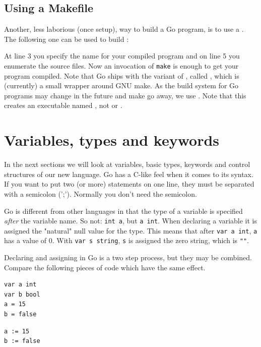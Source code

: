 \subsection{Using a Makefile}
\label{sec:building a program}
Another, less laborious (once setup), way to build a Go program, is to use a
. The following one can be used to build
:

At line 3 you specify the name for your compiled program and on line 5
you enumerate the source files. Now an invocation of \verb|make| is
enough to get your program compiled. Note that Go ships with the variant
of , called , which is (currently) a small
wrapper around GNU make. As the build system for Go programs may
change in the future and make  go away, we use .
Note that this  creates an executable named
, not  or .

\section{Variables, types and keywords}
\label{sec:vars}
In the next sections we will look at variables, basic types,
keywords and control structures of our new language. 
Go has a C-like feel when it comes to its syntax. 
If you want to put two (or more) statements on one line, they must be
separated with a semicolon (';'). Normally you don't need the semicolon.

Go is different from other languages in that the type of a variable
is specified \emph{after} the variable name. So not: 
\lstinline{int a}, but \lstinline{a int}. When declaring a variable it
is assigned the "natural" null value for the type. This means that after
\lstinline{var a int}, \lstinline{a} has a value of 0. With
\lstinline{var s string}, \lstinline{s} is assigned the zero string,
which is \lstinline{""}. 

Declaring and assigning in Go is a two step process, but they may
be combined. Compare the following pieces of code which have
the same effect. 

\begin{minipage}{.5\textwidth}
\begin{lstlisting}[linewidth=.5\textwidth,caption={Declaration with =}]
var a int
var b bool
a = 15
b = false
\end{lstlisting}
\hfill
\end{minipage}
\begin{minipage}{.5\textwidth}
\begin{lstlisting}[linewidth=.5\textwidth,caption={Declaration with :=}]
a := 15
b := false
\end{lstlisting}
\ \\
\ \\
\hfill
\end{minipage}

